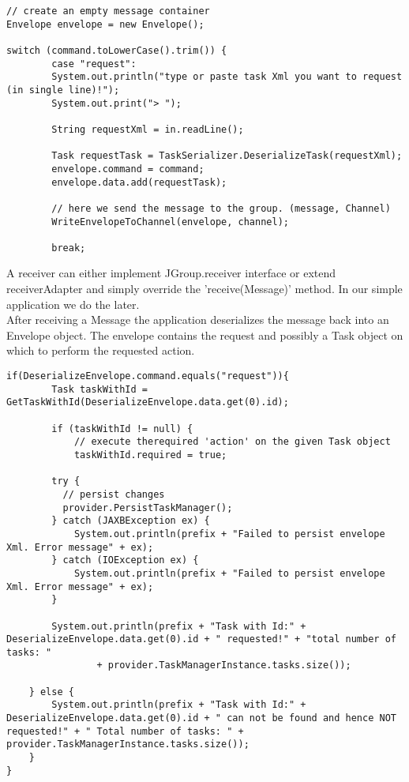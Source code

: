 \pagebreak
\begin{lstlisting}[caption=eventloop]
// create an empty message container
Envelope envelope = new Envelope();

switch (command.toLowerCase().trim()) {
        case "request":
        System.out.println("type or paste task Xml you want to request (in single line)!");
        System.out.print("> ");
            		
        String requestXml = in.readLine();

        Task requestTask = TaskSerializer.DeserializeTask(requestXml);
        envelope.command = command;
        envelope.data.add(requestTask);

        // here we send the message to the group. (message, Channel)
        WriteEnvelopeToChannel(envelope, channel);
            		
   	   	break;

\end{lstlisting}

A receiver can either implement JGroup.receiver interface or extend receiverAdapter and simply override the 'receive(Message)' method. In our simple application we do the later. \\

After receiving a Message the application deserializes the message back into an Envelope object. The envelope contains the request and possibly a Task object on which to perform the requested action.

\begin{lstlisting}[caption=receiver]
if(DeserializeEnvelope.command.equals("request")){
	    Task taskWithId = GetTaskWithId(DeserializeEnvelope.data.get(0).id);
		
	    if (taskWithId != null) {
		    // execute therequired 'action' on the given Task object
	      	taskWithId.required = true;
		
	    try {
		  // persist changes
		  provider.PersistTaskManager();
	    } catch (JAXBException ex) {
	        System.out.println(prefix + "Failed to persist envelope Xml. Error message" + ex);
	    } catch (IOException ex) {
	        System.out.println(prefix + "Failed to persist envelope Xml. Error message" + ex);
	    }
		
	    System.out.println(prefix + "Task with Id:" + DeserializeEnvelope.data.get(0).id + " requested!" + "total number of tasks: "
	            + provider.TaskManagerInstance.tasks.size());
		
	} else {
	    System.out.println(prefix + "Task with Id:" + DeserializeEnvelope.data.get(0).id + " can not be found and hence NOT requested!" + " Total number of tasks: " + provider.TaskManagerInstance.tasks.size());
	}
}
\end{lstlisting}

